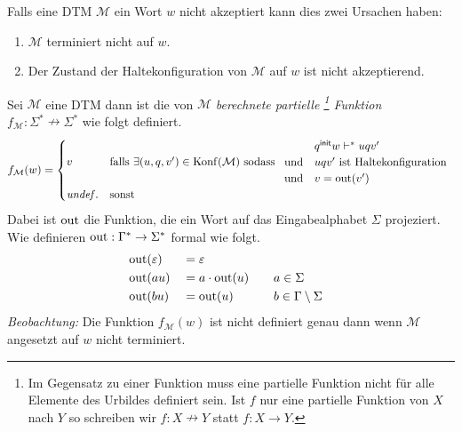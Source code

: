 Falls eine \ac{DTM} $\mathcal{M}$ ein Wort $w$ nicht akzeptiert kann dies zwei Ursachen haben:
\begin{enumerate}
 \item $\mathcal{M}$ terminiert nicht auf $w$.
 \item Der Zustand der Haltekonfiguration von $\mathcal{M}$ auf $w$ ist nicht akzeptierend.
\end{enumerate}


\begin{Def} %
Sei $\mathcal{M}$ eine \ac{DTM} dann ist die von $\mathcal{M}$ \emph{berechnete partielle
\footnote{Im Gegensatz zu einer Funktion muss eine partielle Funktion nicht für alle Elemente des Urbildes definiert sein.
Ist $f$ nur eine partielle Funktion von $X$ nach $Y$ so schreiben wir $f: X\nrightarrow Y$ statt $f: X\rightarrow Y$. }
Funktion} $f_\mathcal{M}:\Sigma^*\nrightarrow\Sigma^*$ wie folgt definiert.
$$
f_\mathcal{M}(w)= 
\begin{cases}
 v &\text{falls } \exists (u,q,v')\in \operatorname{Konf}(\mathcal{M}) \text{ sodass }
 \begin{array}{ll}
  & q^\mathsf{init} w \vdash^*uqv'\\
  \text{und} & uqv'\text{ ist Haltekonfiguration}\\
  \text{und} & v=\operatorname{out}( v')
 \end{array}
\\
 \mathit{undef.} & \text{sonst}
\end{cases}
$$
Dabei ist $\operatorname{out}$ die Funktion, die ein Wort auf das Eingabealphabet $\Sigma$ projeziert. 
Wie definieren $\out:\Gamma^* \-> \Sigma^*$ formal wie folgt.
	\begin{alignat*}{3}
		&\operatorname{out}(\varepsilon) &&= \varepsilon\\
		&\operatorname{out}(au) &&= a\cdot\operatorname{out}(u) &\quad& a\in\Sigma\\
		&\operatorname{out}(bu) &&= \operatorname{out}(u) && b\in\Gamma\setminus\Sigma
	\end{alignat*}
\emph{Beobachtung:} Die Funktion $f_\mathcal{M}(w)$ ist nicht definiert
genau dann wenn $\mathcal{M}$ angesetzt auf $w$ nicht terminiert.
\end{Def}

